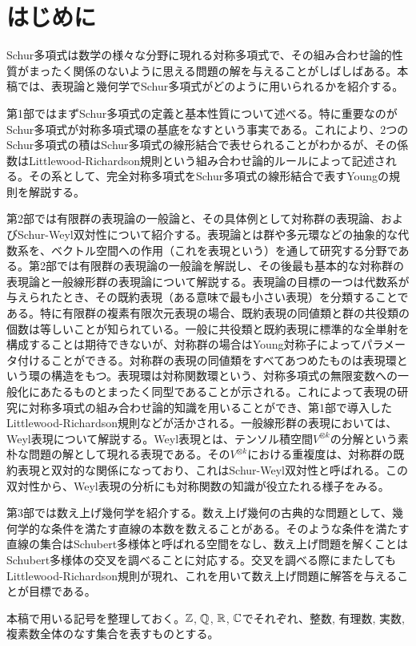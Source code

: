 \chapter*{はじめに}
Schur多項式は数学の様々な分野に現れる対称多項式で、その組み合わせ論的性質がまったく関係のないように思える問題の解を与えることがしばしばある。本稿では、表現論と幾何学でSchur多項式がどのように用いられるかを紹介する。


第1部ではまずSchur多項式の定義と基本性質について述べる。特に重要なのがSchur多項式が対称多項式環の基底をなすという事実である。これにより、2つのSchur多項式の積はSchur多項式の線形結合で表せられることがわかるが、その係数はLittlewood-Richardson規則という組み合わせ論的ルールによって記述される。その系として、完全対称多項式をSchur多項式の線形結合で表すYoungの規則を解説する。


第2部では有限群の表現論の一般論と、その具体例として対称群の表現論、およびSchur-Weyl双対性について紹介する。表現論とは群や多元環などの抽象的な代数系を、ベクトル空間への作用（これを表現という）を通して研究する分野である。第2部では有限群の表現論の一般論を解説し、その後最も基本的な対称群の表現論と一般線形群の表現論について解説する。表現論の目標の一つは代数系が与えられたとき、その既約表現（ある意味で最も小さい表現）を分類することである。特に有限群の複素有限次元表現の場合、既約表現の同値類と群の共役類の個数は等しいことが知られている。一般に共役類と既約表現に標準的な全単射を構成することは期待できないが、対称群の場合はYoung対称子によってパラメータ付けることができる。対称群の表現の同値類をすべてあつめたものは表現環という環の構造をもつ。表現環は対称関数環という、対称多項式の無限変数への一般化にあたるものとまったく同型であることが示される。これによって表現の研究に対称多項式の組み合わせ論的知識を用いることができ、第1部で導入したLittlewood-Richardson規則などが活かされる。一般線形群の表現においては、Weyl表現について解説する。Weyl表現とは、テンソル積空間$V^{\otimes k}$の分解という素朴な問題の解として現れる表現である。その$V^{\otimes k}$における重複度は、対称群の既約表現と双対的な関係になっており、これはSchur-Weyl双対性と呼ばれる。この双対性から、Weyl表現の分析にも対称関数の知識が役立たれる様子をみる。

第3部では数え上げ幾何学を紹介する。数え上げ幾何の古典的な問題として、幾何学的な条件を満たす直線の本数を数えることがある。そのような条件を満たす直線の集合はSchubert多様体と呼ばれる空間をなし、数え上げ問題を解くことはSchubert多様体の交叉を調べることに対応する。交叉を調べる際にまたしてもLittlewood-Richardson規則が現れ、これを用いて数え上げ問題に解答を与えることが目標である。


本稿で用いる記号を整理しておく。$\mathbb{Z}$, $\mathbb{Q}$, $\mathbb{R}$, $\mathbb{C}$でそれぞれ、整数, 有理数, 実数, 複素数全体のなす集合を表すものとする。